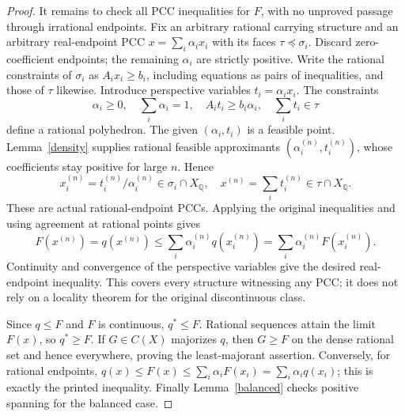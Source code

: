 \documentclass[11pt]{article}
\newcommand{\Q}{\mathbb Q}
\begin{document}
\begin{proof}
It remains to check all PCC inequalities for $F$, with no unproved passage through irrational endpoints. Fix an arbitrary rational carrying structure and an arbitrary real-endpoint PCC $x=\sum_i\alpha_i x_i$ with its faces $\tau\preceq\sigma_i$. Discard zero-coefficient endpoints; the remaining $\alpha_i$ are strictly positive. Write the rational constraints of $\sigma_i$ as $A_ix_i\geq b_i$, including equations as pairs of inequalities, and those of $\tau$ likewise. Introduce perspective variables $t_i=\alpha_i x_i$. The constraints
\begin{equation}\label{perspective}
 \alpha_i\geq0,\quad\sum_i\alpha_i=1,\quad A_i t_i\geq b_i\alpha_i,\quad \sum_i t_i\in\tau
\end{equation}
define a rational polyhedron. The given $(\alpha_i,t_i)$ is a feasible point. Lemma~\ref{density} supplies rational feasible approximants $(\alpha_i^{(n)},t_i^{(n)})$, whose coefficients stay positive for large $n$. Hence
\[x_i^{(n)}=t_i^{(n)}/\alpha_i^{(n)}\in\sigma_i\cap X_\Q,
 \quad x^{(n)}=\sum_i t_i^{(n)}\in\tau\cap X_\Q.
\]
These are actual rational-endpoint PCCs. Applying the original inequalities and using agreement at rational points gives
\[F(x^{(n)})=q(x^{(n)})\leq\sum_i\alpha_i^{(n)}q(x_i^{(n)})
 =\sum_i\alpha_i^{(n)}F(x_i^{(n)}).
\]
Continuity and convergence of the perspective variables give the desired real-endpoint inequality. This covers every structure witnessing any PCC; it does not rely on a locality theorem for the original discontinuous class.

Since $q\leq F$ and $F$ is continuous, $q^*\leq F$. Rational sequences attain the limit $F(x)$, so $q^*\geq F$. If $G\in C(X)$ majorizes $q$, then $G\geq F$ on the dense rational set and hence everywhere, proving the least-majorant assertion. Conversely, for rational endpoints, $q(x)\leq F(x)\leq\sum_i\alpha_i F(x_i)=\sum_i\alpha_i q(x_i)$; this is exactly the printed inequality. Finally Lemma~\ref{balanced} checks positive spanning for the balanced case.
\end{proof}
\end{document}
